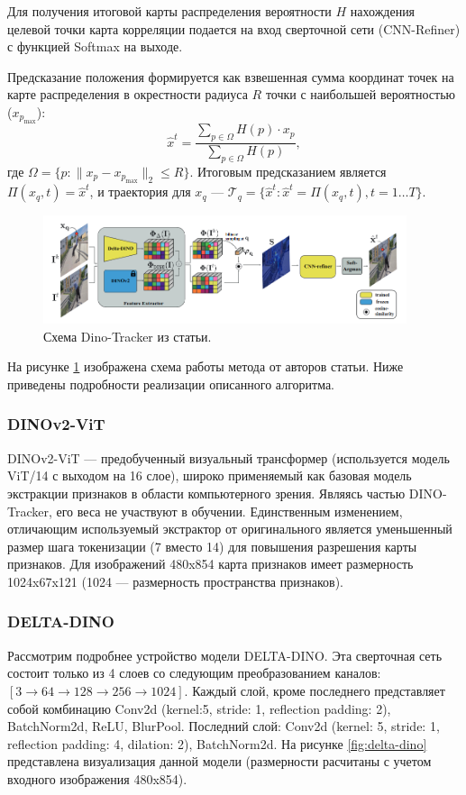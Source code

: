 \documentclass[a4paper, 14pt]{extarticle}
\theoremstyle{definition}
\theoremstyle{plain}
\theoremstyle{remark}
\begin{document}
Для получения итоговой карты распределения вероятности $H$ нахождения целевой точки карта корреляции подается на вход сверточной сети (CNN-Refiner) с функцией Softmax на выходе.

Предсказание положения формируется как взвешенная сумма координат точек на карте распределения в окрестности радиуса $R$ точки с наибольшей вероятностью ($x_{p_{\text{max}}}$):
\begin{equation} \label{eq:prediction}
	\hat{{x}}^t = \frac{\sum_{{p} \in \Omega} {H}({p}) \cdot {x}_{{p}}}{\sum_{{p} \in \Omega} {H}({p})},
\end{equation}
где \(\Omega = \{{p} : \|{x}_{{p}} - {x}_{{p}_{\text{max}}}\|_2 \leq R\}\). Итоговым предсказанием является \(\Pi({x}_q, t) = \hat{{x}}^t\), и траектория для \({x}_q\) --- \(\mathcal{T}_q = \{\hat{{x}}^t : \hat{{x}}^t = \Pi({x}_q, t), t = 1 \dots T\}\).
\begin{figure}
    [H]
    \centering
    \includegraphics[width=0.95\textwidth]{figs/demo.png}
    \caption{Схема Dino-Tracker из статьи.}
    \label{fig:tracker-scheme}
\end{figure}

На рисунке \ref{fig:tracker-scheme} изображена схема работы метода от авторов статьи. Ниже приведены подробности реализации описанного алгоритма.
\subsubsection{DINOv2-ViT}
DINOv2-ViT --- предобученный визуальный трансформер (используется модель ViT/14 с выходом на 16 слое), широко применяемый как базовая модель экстракции признаков в области компьютерного зрения.
Являясь частью DINO-Tracker, его веса не участвуют в обучении. Единственным изменением, отличающим используемый экстрактор от оригинального является уменьшенный размер шага токенизации (7 вместо 14) для повышения разрешения карты признаков.
Для изображений 480x854 карта признаков имеет размерность 1024x67x121 (1024 --- размерность пространства признаков).
\subsubsection{DELTA-DINO}
Рассмотрим подробнее устройство модели DELTA-DINO. 
Эта сверточная сеть состоит только из 4 слоев со следующим преобразованием каналов: $[3 \to 64 \to 128 \to 256 \to 1024]$. 
Каждый слой, кроме последнего представляет собой комбинацию Conv2d (kernel:5, stride: 1, reflection padding: 2), BatchNorm2d, ReLU, BlurPool. 
Последний слой: Conv2d (kernel: 5, stride: 1, reflection padding: 4, dilation: 2), BatchNorm2d. 
На рисунке \ref{fig:delta-dino} представлена визуализация данной модели (размерности расчитаны с учетом входного изображения 480x854).
\end{document}
